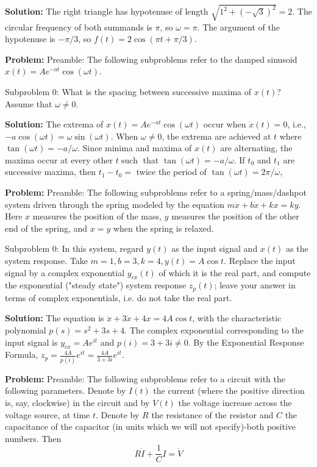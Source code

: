 \documentclass[10pt]{article}
\begin{document}
\textbf{Solution:}
The right triangle has hypotenuse of length $\sqrt{1^{2}+(-\sqrt{3})^{2}}=2$. The circular frequency of both summands is $\pi$, so $\omega=\pi$. The argument of the hypotenuse is $-\pi / 3$, so $f(t)=\boxed{2 \cos (\pi t+\pi / 3)}$.


\textbf{Problem:}
Preamble: The following subproblems refer to the damped sinusoid $x(t)=A e^{-a t} \cos (\omega t)$.

Subproblem 0: What is the spacing between successive maxima of $x(t)$? Assume that $\omega \neq 0$. 


\textbf{Solution:}
The extrema of $x(t)=A e^{-a t} \cos (\omega t)$ occur when $\dot{x}(t)=0$, i.e., $-a \cos (\omega t)=\omega \sin (\omega t)$. When $\omega \neq 0$, the extrema are achieved at $t$ where $\tan (\omega t)=-a / \omega$. Since minima and maxima of $x(t)$ are alternating, the maxima occur at every other $t \operatorname{such}$ that $\tan (\omega t)=-a / \omega$. If $t_{0}$ and $t_{1}$ are successive maxima, then $t_{1}-t_{0}=$ twice the period of $\tan (\omega t)=\boxed{2 \pi / \omega}$, 


\textbf{Problem:}
Preamble: The following subproblems refer to a spring/mass/dashpot system driven through the spring modeled by the equation $m \ddot{x}+b \dot{x}+k x=k y$. Here $x$ measures the position of the mass, $y$ measures the position of the other end of the spring, and $x=y$ when the spring is relaxed.

Subproblem 0: In this system, regard $y(t)$ as the input signal and $x(t)$ as the system response. Take $m=1, b=3, k=4, y(t)=A \cos t$. Replace the input signal by a complex exponential $y_{c x}(t)$ of which it is the real part, and compute the exponential ("steady state") system response $z_p(t)$; leave your answer in terms of complex exponentials, i.e. do not take the real part.


\textbf{Solution:}
The equation is $\ddot{x}+3 \dot{x}+4 x=4 A \cos t$, with the characteristic polynomial $p(s)=s^{2}+3 s+4$. The complex exponential corresponding to the input signal is $y_{c x}=A e^{i t}$ and $p(i)=3+3 i \neq 0$. By the Exponential Response Formula, $z_{p}=\frac{4 A}{p(i)} e^{i t}=\boxed{\frac{4 A}{3+3 i} e^{i t}}$. 


\textbf{Problem:}
Preamble: The following subproblems refer to a circuit with the following parameters. Denote by $I(t)$ the current (where the positive direction is, say, clockwise) in the circuit and by $V(t)$ the voltage increase across the voltage source, at time $t$. Denote by $R$ the resistance of the resistor and $C$ the capacitance of the capacitor (in units which we will not specify)-both positive numbers. Then
\[
R \dot{I}+\frac{1}{C} I=\dot{V}
\]
\end{document}
